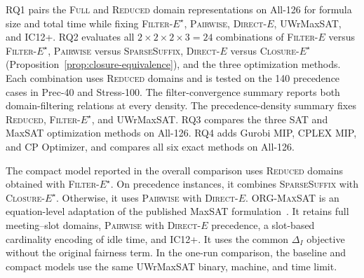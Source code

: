 \documentclass[conference,a4paper]{IEEEtran}
\newcommand{\revised}[1]{#1}
\begin{document}
RQ1 pairs the \mbox{\textsc{Full}} and \mbox{\textsc{Reduced}} domain representations on All-126 for formula size and total time while fixing \mbox{\textnormal{\textsc{Filter-}}\ensuremath{E^\star}}, \mbox{\textnormal{\textsc{Pairwise}}}, \mbox{\textnormal{\textsc{Direct-}}\ensuremath{E}}, UWrMaxSAT, and \textsc{IC12+}.  RQ2 evaluates all $2\times2\times2\times3=24$ combinations of \mbox{\textnormal{\textsc{Filter-}}\ensuremath{E}} versus \mbox{\textnormal{\textsc{Filter-}}\ensuremath{E^\star}}, \mbox{\textnormal{\textsc{Pairwise}}} versus \mbox{\textnormal{\textsc{SparseSuffix}}}, \mbox{\textnormal{\textsc{Direct-}}\ensuremath{E}} versus \mbox{\textnormal{\textsc{Closure-}}\ensuremath{E^\star}} \revised{(Proposition~\ref{prop:closure-equivalence})}, and the three optimization methods.  Each combination uses \mbox{\textsc{Reduced}} domains and is tested on the 140 precedence cases in Prec-40 and Stress-100.  The filter-convergence summary reports both domain-filtering relations at every density.  The precedence-density summary fixes \mbox{\textsc{Reduced}}, \mbox{\textnormal{\textsc{Filter-}}\ensuremath{E^\star}}, and UWrMaxSAT.  RQ3 compares the three SAT and MaxSAT optimization methods on All-126. RQ4 adds Gurobi MIP, CPLEX MIP, and CP Optimizer, and compares all six exact methods on All-126.

\revised{The compact model reported in the overall comparison uses \mbox{\textsc{Reduced}} domains obtained with \mbox{\textnormal{\textsc{Filter-}}\ensuremath{E^\star}}.  On precedence instances, it combines \mbox{\textnormal{\textsc{SparseSuffix}}} with \mbox{\textnormal{\textsc{Closure-}}\ensuremath{E^\star}}.  Otherwise, it uses \mbox{\textnormal{\textsc{Pairwise}}} with \mbox{\textnormal{\textsc{Direct-}}\ensuremath{E}}. \mbox{\textsc{ORG-MaxSAT}} is an equation-level adaptation of the published MaxSAT formulation~\cite{bofill2022}.  It retains full meeting--slot domains, \mbox{\textnormal{\textsc{Pairwise}}} with \mbox{\textnormal{\textsc{Direct-}}\ensuremath{E}} precedence, a slot-based cardinality encoding of idle time, and \textsc{IC12+}.  It uses the common $\Delta_I$ objective without the original fairness term.  In the one-run comparison, the baseline and compact models use the same UWrMaxSAT binary, machine, and time limit.}
\end{document}

